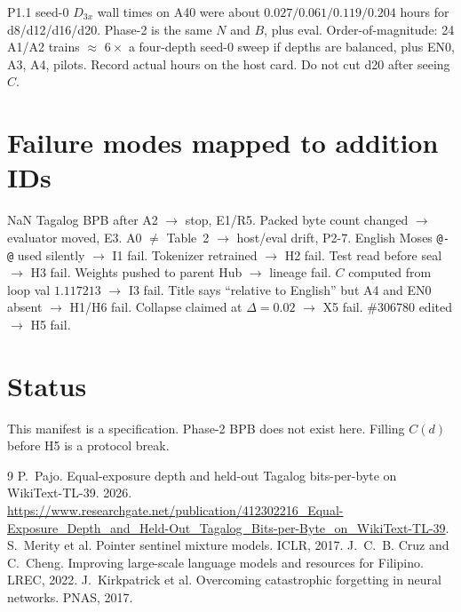 \documentclass[11pt,a4paper]{article}
\begin{document}
P1.1 seed-0 $D_{3x}$ wall times on A40 were about $0.027/0.061/0.119/0.204$ hours for d8/d12/d16/d20. Phase-2 is the same $N$ and $B$, plus eval. Order-of-magnitude: 24 A1/A2 trains $\approx$ $6\times$ a four-depth seed-0 sweep if depths are balanced, plus EN0, A3, A4, pilots. Record actual hours on the host card. Do not cut d20 after seeing $C$.

\section{Failure modes mapped to addition IDs}
\label{app:fail}

NaN Tagalog BPB after A2 $\rightarrow$ stop, E1/R5. Packed byte count changed $\rightarrow$ evaluator moved, E3. A0 $\neq$ Table~2 $\rightarrow$ host/eval drift, P2-7. English Moses \texttt{@-@} used silently $\rightarrow$ I1 fail. Tokenizer retrained $\rightarrow$ H2 fail. Test read before seal $\rightarrow$ H3 fail. Weights pushed to parent Hub $\rightarrow$ lineage fail. $C$ computed from loop val $1.117213$ $\rightarrow$ I3 fail. Title says ``relative to English'' but A4 and EN0 absent $\rightarrow$ H1/H6 fail. Collapse claimed at $\Delta=0.02$ $\rightarrow$ X5 fail. \#306780 edited $\rightarrow$ H5 fail.

\section*{Status}
This manifest is a specification. Phase-2 BPB does not exist here. Filling $C(d)$ before H5 is a protocol break.

\begin{thebibliography}{9}
P.~Pajo. Equal-exposure depth and held-out Tagalog bits-per-byte on WikiText-TL-39. 2026.
\url{https://www.researchgate.net/publication/412302216_Equal-Exposure_Depth_and_Held-Out_Tagalog_Bits-per-Byte_on_WikiText-TL-39}.
S.~Merity et al. Pointer sentinel mixture models. ICLR, 2017.
J.~C.~B. Cruz and C.~Cheng. Improving large-scale language models and resources for Filipino. LREC, 2022.
J.~Kirkpatrick et al. Overcoming catastrophic forgetting in neural networks. PNAS, 2017.
\end{thebibliography}
\end{document}
